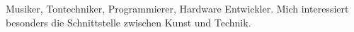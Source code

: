 %
%

\par{
	Musiker, Tontechniker, Programmierer, Hardware Entwickler. Mich interessiert
	besonders die Schnittstelle zwischen Kunst und Technik.
}